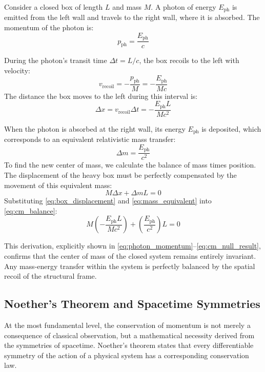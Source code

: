 \documentclass[journal,10pt,twoside]{IEEEtran}
\begin{document}
Consider a closed box of length $L$ and mass $M$. A photon of energy $E_{\text{ph}}$ is emitted from the left wall and travels to the right wall, where it is absorbed. The momentum of the photon is:
\begin{equation}
p_{\text{ph}} = \frac{E_{\text{ph}}}{c}
\label{eq:photon_momentum}
\end{equation}

During the photon's transit time $\Delta t = L/c$, the box recoils to the left with velocity:
\begin{equation}
v_{\text{recoil}} = -\frac{p_{\text{ph}}}{M} = -\frac{E_{\text{ph}}}{M c}
\label{eq:recoil_velocity}
\end{equation}
The distance the box moves to the left during this interval is:
\begin{equation}
\Delta x = v_{\text{recoil}} \Delta t = -\frac{E_{\text{ph}} L}{M c^2}
\label{eq:box_displacement}
\end{equation}

When the photon is absorbed at the right wall, its energy $E_{\text{ph}}$ is deposited, which corresponds to an equivalent relativistic mass transfer:
\begin{equation}
\Delta m = \frac{E_{\text{ph}}}{c^2}
\label{eq:mass_equivalent}
\end{equation}
To find the new center of mass, we calculate the balance of mass times position. The displacement of the heavy box must be perfectly compensated by the movement of this equivalent mass:
\begin{equation}
M \Delta x + \Delta m L = 0
\label{eq:cm_balance}
\end{equation}
Substituting \eqref{eq:box_displacement} and \eqref{eq:mass_equivalent} into \eqref{eq:cm_balance}:
\begin{equation}
M \left( -\frac{E_{\text{ph}} L}{M c^2} \right) + \left( \frac{E_{\text{ph}}}{c^2} \right) L = 0
\label{eq:cm_null_result}
\end{equation}

This derivation, explicitly shown in \eqref{eq:photon_momentum}--\eqref{eq:cm_null_result}, confirms that the center of mass of the closed system remains entirely invariant. Any mass-energy transfer within the system is perfectly balanced by the spatial recoil of the structural frame.

\subsection{Noether's Theorem and Spacetime Symmetries}
At the most fundamental level, the conservation of momentum is not merely a consequence of classical observation, but a mathematical necessity derived from the symmetries of spacetime. Noether's theorem states that every differentiable symmetry of the action of a physical system has a corresponding conservation law.
\end{document}

